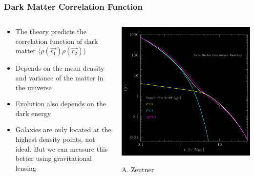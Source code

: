 \documentclass{beamer}
\begin{document}
\frame
{

    \frametitle{Dark Matter Correlation Function}


    \begin{columns}
        \begin{column}{0.5\textwidth}
            \begin{itemize}

                \item The theory predicts the correlation function of
                    dark matter {\color{gold} $\langle \rho(\vec{r_1}) \rho(\vec{r_2})
                    \rangle$ }

                \item Depends on the mean density and variance of the matter 
                    in the universe

                \item Evolution also depends on the dark energy
 
                \item Galaxies are only located at the highest density points,
                    not ideal.  But we can measure this better using
                    {\color{lightskyblue} gravitational lensing}

            \end{itemize}

        \end{column}
        \begin{column}{0.5\textwidth}
            \begin{center}
                \includegraphics[width=\textwidth]{zentner-halo-model-inv.png}
            \end{center}
            {\tiny A. Zentner}
        \end{column}

    \end{columns}


}
\end{document}
